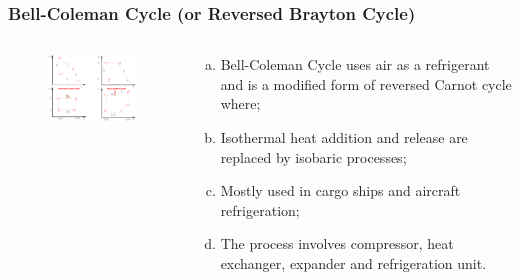 \documentclass[10pt,compress]{beamer}
\begin{document}
\begin{frame}
 \frametitle{Bell-Coleman Cycle (or Reversed Brayton Cycle)}
  \begin{columns}

   \begin{column}[c]{0.55\linewidth}
    \begin{figure}%
     \begin{center}
      \includegraphics[width=6.8cm,height=6.cm]{./Pics/Overview_Refrig7}
     \end{center}
    \end{figure}  
   \end{column}  


   \begin{column}[c]{0.45\linewidth}
    \begin{enumerate}[(a)]
     \item <1-> Bell-Coleman Cycle uses air as a refrigerant and is a modified form of reversed Carnot cycle where;
     \item <2-> Isothermal heat addition and release are replaced by isobaric processes;
     \item <3-> Mostly used in cargo ships and aircraft refrigeration;
     \item <4-> The process involves compressor, heat exchanger, expander and refrigeration unit.
    \end{enumerate}
   \end{column}
  \end{columns}


\end{frame}
\end{document}
